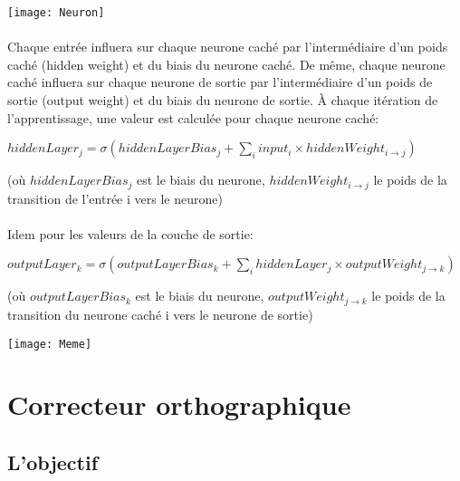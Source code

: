 \documentclass{article}
\begin{document}
\begin{center}
	\texttt{[image: Neuron]}
\end{center}

\paragraph{} Chaque entrée influera sur chaque neurone caché par l’intermédiaire d’un poids caché (hidden weight) et du biais du neurone caché.
De même, chaque neurone caché influera sur chaque neurone de sortie par l’intermédiaire d’un poids de sortie (output weight) et du biais du neurone de sortie.
À chaque itération de l’apprentissage, une valeur est calculée pour chaque neurone caché:
\newline

$hiddenLayer_j=\sigma(hiddenLayerBias_j+\sum_i input_i\times hiddenWeight_{i\rightarrow j})$

(où $hiddenLayerBias_j$ est le biais du neurone, $hiddenWeight_{i\rightarrow j}$ le poids de la transition de l’entrée i vers le neurone)

\vspace*{0.3cm}

\paragraph{} Idem pour les valeurs de la couche de sortie:\newline

$outputLayer_k=\sigma(outputLayerBias_k+\sum_i hiddenLayer_j\times outputWeight_{j\rightarrow k})$


(où $outputLayerBias_k$ est le biais du neurone, $outputWeight_{j\rightarrow k}$ le poids de la transition du neurone caché i vers le neurone de sortie)

\begin{center}
	\texttt{[image: Meme]}
\end{center}

\newpage
{}
\section{Correcteur orthographique}

\subsection{L'objectif}
\end{document}
